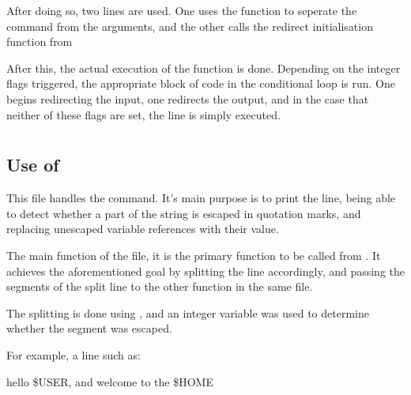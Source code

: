 \documentclass[12pt, a4paper]{report}
\begin{document}
                After doing so, two lines are used. One uses the  function to
                seperate the command from the arguments, and the other calls the 
                redirect initialisation function from 

                \begingroup
                \fontsize{10pt}{10pt}\selectfont
                \endgroup
                After this, the actual execution of the function is done. Depending on 
                the integer flags triggered, the appropriate block of code in the
                conditional loop is run. One begins redirecting the input, one redirects
                the output, and in the case that neither of these flags are set, the
                line is simply executed.

                \begingroup
                \fontsize{10pt}{10pt}\selectfont
                \endgroup

        \section{}
            \subsection{Use of }
                This file handles the  command. It's main purpose
                is to print the line, being able to detect whether a part of
                the string is escaped in quotation marks, and replacing 
                unescaped variable references with their value.

                The main function of the file, it is the primary function to
                be called from . It achieves the aforementioned
                goal by splitting the line accordingly, and passing the 
                segments of the split line to the other function in the same file.

                The splitting is done using , and an integer variable
                 was used to determine whether the segment was escaped.

                For example, a line such as:

                \begin{center}
                    hello \$USER, and wel\quot come to the \$HOME\quot
                \end{center}
                
\end{document}
